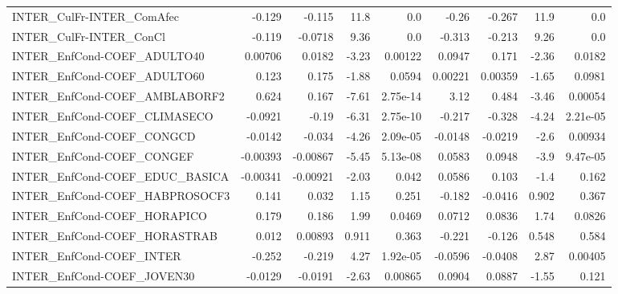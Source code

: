 \begin{tabular}{lrrrrrrrr}
INTER\_CulFr-INTER\_ComAfec              &      -0.129 &       -0.115 &    11.8 &      0.0 &      -0.26 &      -0.267 &         11.9 &           0.0 \\
INTER\_CulFr-INTER\_ConCl                &      -0.119 &      -0.0718 &    9.36 &      0.0 &     -0.313 &      -0.213 &         9.26 &           0.0 \\
INTER\_EnfCond-COEF\_ADULTO40            &     0.00706 &       0.0182 &   -3.23 &  0.00122 &     0.0947 &       0.171 &        -2.36 &        0.0182 \\
INTER\_EnfCond-COEF\_ADULTO60            &       0.123 &        0.175 &   -1.88 &   0.0594 &    0.00221 &     0.00359 &        -1.65 &        0.0981 \\
INTER\_EnfCond-COEF\_AMBLABORF2          &       0.624 &        0.167 &   -7.61 & 2.75e-14 &       3.12 &       0.484 &        -3.46 &       0.00054 \\
INTER\_EnfCond-COEF\_CLIMASECO           &     -0.0921 &        -0.19 &   -6.31 & 2.75e-10 &     -0.217 &      -0.328 &        -4.24 &      2.21e-05 \\
INTER\_EnfCond-COEF\_CONGCD              &     -0.0142 &       -0.034 &   -4.26 & 2.09e-05 &    -0.0148 &     -0.0219 &         -2.6 &       0.00934 \\
INTER\_EnfCond-COEF\_CONGEF              &    -0.00393 &     -0.00867 &   -5.45 & 5.13e-08 &     0.0583 &      0.0948 &         -3.9 &      9.47e-05 \\
INTER\_EnfCond-COEF\_EDUC\_BASICA         &    -0.00341 &     -0.00921 &   -2.03 &    0.042 &     0.0586 &       0.103 &         -1.4 &         0.162 \\
INTER\_EnfCond-COEF\_HABPROSOCF3         &       0.141 &        0.032 &    1.15 &    0.251 &     -0.182 &     -0.0416 &        0.902 &         0.367 \\
INTER\_EnfCond-COEF\_HORAPICO            &       0.179 &        0.186 &    1.99 &   0.0469 &     0.0712 &      0.0836 &         1.74 &        0.0826 \\
INTER\_EnfCond-COEF\_HORASTRAB           &       0.012 &      0.00893 &   0.911 &    0.363 &     -0.221 &      -0.126 &        0.548 &         0.584 \\
INTER\_EnfCond-COEF\_INTER               &      -0.252 &       -0.219 &    4.27 & 1.92e-05 &    -0.0596 &     -0.0408 &         2.87 &       0.00405 \\
INTER\_EnfCond-COEF\_JOVEN30             &     -0.0129 &      -0.0191 &   -2.63 &  0.00865 &     0.0904 &      0.0887 &        -1.55 &         0.121 \\

\end{tabular}
